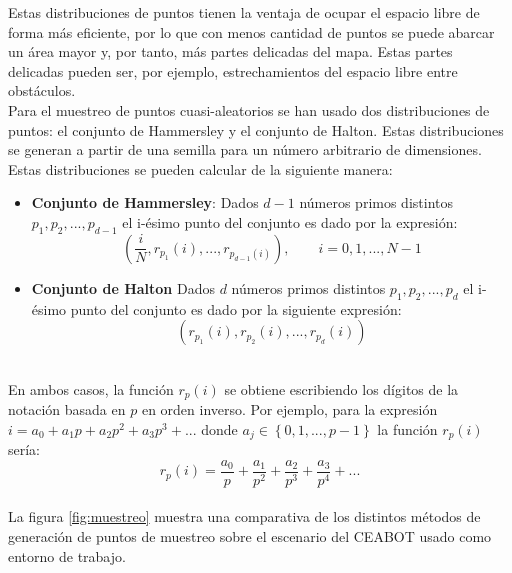 Estas distribuciones de puntos tienen la ventaja de ocupar el espacio libre de forma más eficiente, por lo que con menos cantidad de puntos se puede abarcar un área mayor y, por tanto, más partes delicadas del mapa. Estas partes delicadas pueden ser, por ejemplo, estrechamientos del espacio libre entre obstáculos.\\


Para el muestreo de puntos cuasi-aleatorios se han usado dos distribuciones de puntos: el conjunto de Hammersley y el conjunto de Halton. Estas distribuciones se generan a partir de una semilla para un número arbitrario de dimensiones. Estas distribuciones se pueden calcular de la siguiente manera:
\begin{itemize}
\item \textbf{Conjunto de Hammersley}: Dados $d-1$ números primos distintos $p_1, p_2, ... , p_{d-1}$ el i-ésimo punto del conjunto es dado por la expresión:
\[ \left( \frac{i}{N}, r_{p_1}(i), ..., r_{p_{d-1}(i)} \right), \qquad i = 0, 1, ..., N-1\]

\item \textbf{Conjunto de Halton} Dados $d$ números primos distintos $p_1, p_2, ..., p_d$ el i-ésimo punto del conjunto es dado por la siguiente expresión:
\[ \left( r_{p_1}(i),  r_{p_2}(i), ...,  r_{p_d}(i) \right) \]

\end{itemize}~\\

En ambos casos, la función $r_p(i)$ se obtiene  escribiendo los dígitos de la notación basada en $p$ en orden inverso. Por ejemplo, para la expresión $i = a_0 + a_1 p + a_2 p^2 + a_3 p^3 + ... $ donde $a_j \in \left\lbrace 0, 1, ... , p-1 \right\rbrace$ la función $r_p(i)$ sería:\\

\[ r_p(i) = \frac{a_0}{p} + \frac{a_1}{p^2} + \frac{a_2}{p^3} + \frac{a_3}{p^4} + ...\]\\

La figura \ref{fig:muestreo} muestra una comparativa de los distintos métodos de generación de puntos de muestreo sobre el escenario del CEABOT usado como entorno de trabajo. \\

